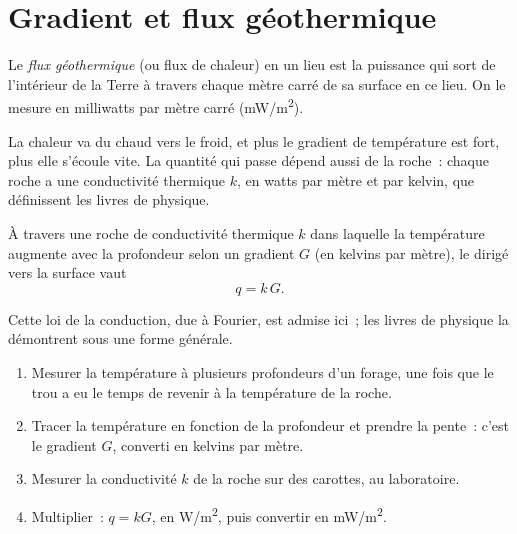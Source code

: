 \section{Gradient et flux géothermique}

\begin{definition}\label{def:g12:internal-heat:heat-flow}
Le \emph{flux géothermique} (ou
flux de chaleur) en un lieu est la puissance qui sort de l'intérieur de la
Terre à travers chaque mètre carré de sa surface en ce lieu. On le mesure
en milliwatts par mètre carré (\unit{mW/m^2}).
\end{definition}

La chaleur va du chaud vers le froid, et plus le gradient de température
est fort, plus elle s'écoule vite. La quantité qui passe dépend aussi de la
roche~: chaque roche a une conductivité thermique $k$, en watts par mètre
et par kelvin, que définissent les livres de physique.

\begin{proposition}\label{prop:g12:internal-heat:fourier}
À travers une roche de conductivité thermique $k$ dans laquelle la
température augmente avec la profondeur selon un gradient $G$ (en kelvins
par mètre), le  dirigé vers la surface vaut
\[
  q = k\,G .
\]
\end{proposition}

Cette loi de la conduction, due à Fourier, est admise ici~; les livres de
physique la démontrent sous une forme générale.

\begin{method}\label{met:g12:internal-heat:borehole}
\begin{enumerate}
  \item Mesurer la température à plusieurs profondeurs d'un forage, une
        fois que le trou a eu le temps de revenir à la température de la
        roche.
  \item Tracer la température en fonction de la profondeur et prendre la
        pente~: c'est le gradient $G$, converti en kelvins par mètre.
  \item Mesurer la conductivité $k$ de la roche sur des carottes, au
        laboratoire.
  \item Multiplier~: $q = kG$, en \unit{W/m^2}, puis convertir en
        \unit{mW/m^2}.
\end{enumerate}
\end{method}

